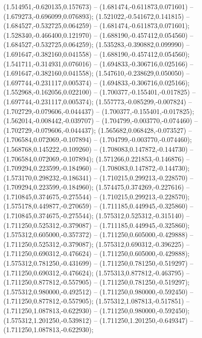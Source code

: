  (1.514951,-0.620135,0.157673) -- (1.681474,-0.611873,0.071601) -- (1.679273,-0.696099,0.076893);
 (1.521022,-0.541672,0.141815) -- (1.684527,-0.532725,0.064259) -- (1.681474,-0.611873,0.071601);
 (1.528340,-0.466400,0.121970) -- (1.688190,-0.457412,0.054560) -- (1.684527,-0.532725,0.064259);
 (1.535283,-0.390882,0.099990) -- (1.691647,-0.382160,0.041558) -- (1.688190,-0.457412,0.054560);
 (1.541711,-0.314931,0.076016) -- (1.694833,-0.306716,0.025166) -- (1.691647,-0.382160,0.041558);
 (1.547610,-0.238629,0.050050) -- (1.697744,-0.231117,0.005374) -- (1.694833,-0.306716,0.025166);
 (1.552968,-0.162056,0.022100) -- (1.700377,-0.155401,-0.017825) -- (1.697744,-0.231117,0.005374);
 (1.557773,-0.085299,-0.007824) -- (1.702729,-0.079606,-0.044437) -- (1.700377,-0.155401,-0.017825);
 (1.562014,-0.008442,-0.039707) -- (1.704799,-0.003770,-0.074460) -- (1.702729,-0.079606,-0.044437);
 (1.565682,0.068428,-0.073527) -- (1.706584,0.072069,-0.107894) -- (1.704799,-0.003770,-0.074460);
 (1.568768,0.145222,-0.109260) -- (1.708083,0.147872,-0.144730) -- (1.706584,0.072069,-0.107894);
 (1.571266,0.221853,-0.146876) -- (1.709294,0.223599,-0.184960) -- (1.708083,0.147872,-0.144730);
 (1.573170,0.298232,-0.186341) -- (1.710215,0.299213,-0.228570) -- (1.709294,0.223599,-0.184960);
 (1.574475,0.374269,-0.227616) -- (1.710845,0.374675,-0.275544) -- (1.710215,0.299213,-0.228570);
 (1.575178,0.449877,-0.270659) -- (1.711185,0.449945,-0.325860) -- (1.710845,0.374675,-0.275544);
 (1.575312,0.525312,-0.315140) -- (1.711250,0.525312,-0.379087) -- (1.711185,0.449945,-0.325860);
 (1.575312,0.605000,-0.357372) -- (1.711250,0.605000,-0.429888) -- (1.711250,0.525312,-0.379087);
 (1.575312,0.690312,-0.396225) -- (1.711250,0.690312,-0.476624) -- (1.711250,0.605000,-0.429888);
 (1.575312,0.781250,-0.431699) -- (1.711250,0.781250,-0.519297) -- (1.711250,0.690312,-0.476624);
 (1.575313,0.877812,-0.463795) -- (1.711250,0.877812,-0.557905) -- (1.711250,0.781250,-0.519297);
 (1.575312,0.980000,-0.492512) -- (1.711250,0.980000,-0.592450) -- (1.711250,0.877812,-0.557905);
 (1.575312,1.087813,-0.517851) -- (1.711250,1.087813,-0.622930) -- (1.711250,0.980000,-0.592450);
 (1.575312,1.201250,-0.539812) -- (1.711250,1.201250,-0.649347) -- (1.711250,1.087813,-0.622930);
